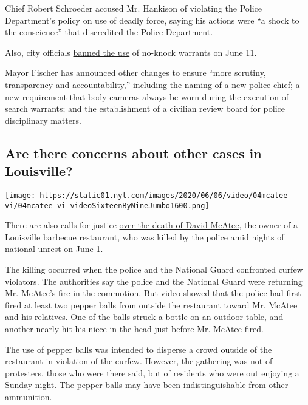 Chief Robert Schroeder accused Mr. Hankison of violating the Police
Department's policy on use of deadly force, saying his actions were ``a
shock to the conscience'' that discredited the Police Department.

Also, city officials
\href{https://www.nytimes.com/2020/06/12/us/breonna-taylor-law-passed.html}{banned
the use} of no-knock warrants on June 11.

Mayor Fischer has
\href{https://www.wlky.com/article/following-protests-louisville-mayor-puts-end-to-no-knock-warrants-for-now/32711443}{announced
other changes} to ensure ``more scrutiny, transparency and
accountability,'' including the naming of a new police chief; a new
requirement that body cameras always be worn during the execution of
search warrants; and the establishment of a civilian review board for
police disciplinary matters.

\hypertarget{are-there-concerns-about-other-cases-in-louisville}{%
\subsection{Are there concerns about other cases in
Louisville?}\label{are-there-concerns-about-other-cases-in-louisville}}

\texttt{[image: https://static01.nyt.com/images/2020/06/06/video/04mcatee-vi/04mcatee-vi-videoSixteenByNineJumbo1600.png]}

There are also calls for justice
\href{https://www.nytimes.com/2020/06/04/us/louisville-unrest-david-mcatee.html}{over
the death of David McAtee}, the owner of a Louisville barbecue
restaurant, who was killed by the police amid nights of national unrest
on June 1.

The killing occurred when the police and the National Guard confronted
curfew violators. The authorities say the police and the National Guard
were returning Mr. McAtee's fire in the commotion. But video showed that
the police had first fired at least two pepper balls from outside the
restaurant toward Mr. McAtee and his relatives. One of the balls struck
a bottle on an outdoor table, and another nearly hit his niece in the
head just before Mr. McAtee fired.

The use of pepper balls was intended to disperse a crowd outside of the
restaurant in violation of the curfew. However, the gathering was not of
protesters, those who were there said, but of residents who were out
enjoying a Sunday night. The pepper balls may have been
indistinguishable from other ammunition.

